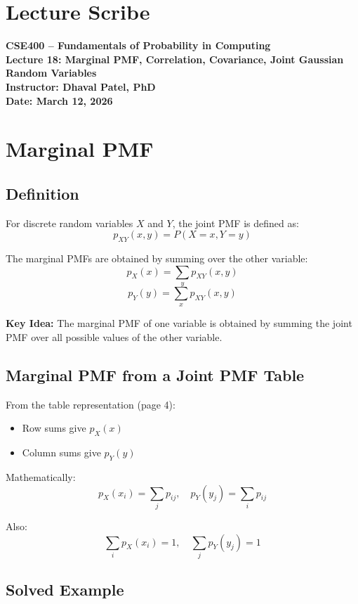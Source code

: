 \documentclass[12pt]{article}
\begin{document}
\section*{Lecture Scribe}

\textbf{CSE400 – Fundamentals of Probability in Computing} \\
\textbf{Lecture 18: Marginal PMF, Correlation, Covariance, Joint Gaussian Random Variables} \\
\textbf{Instructor: Dhaval Patel, PhD} \\
\textbf{Date: March 12, 2026}

\section{Marginal PMF}

\subsection{Definition}

For discrete random variables $X$ and $Y$, the joint PMF is defined as:
\[
p_{XY}(x,y) = P(X = x, Y = y)
\]

The marginal PMFs are obtained by summing over the other variable:
\[
p_X(x) = \sum_y p_{XY}(x,y)
\]
\[
p_Y(y) = \sum_x p_{XY}(x,y)
\]

\textbf{Key Idea:} The marginal PMF of one variable is obtained by summing the joint PMF over all possible values of the other variable.

\subsection{Marginal PMF from a Joint PMF Table}

From the table representation (page 4):

\begin{itemize}
    \item Row sums give $p_X(x)$
    \item Column sums give $p_Y(y)$
\end{itemize}

Mathematically:
\[
p_X(x_i) = \sum_j p_{ij}, \quad p_Y(y_j) = \sum_i p_{ij}
\]

Also:
\[
\sum_i p_X(x_i) = 1, \quad \sum_j p_Y(y_j) = 1
\]

\subsection{Solved Example}
\end{document}
